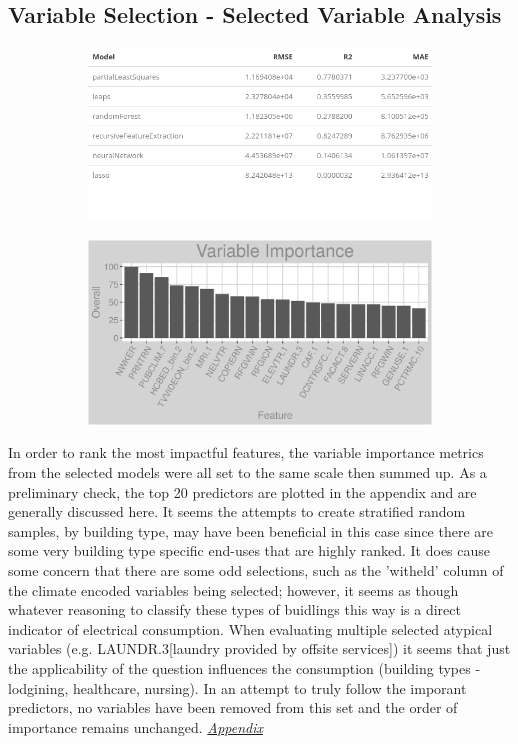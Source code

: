 \subsection{Variable Selection - Selected Variable Analysis}
\begin{figure}[h]
\begin{subfigure}{1\textwidth}
\centering
\includegraphics[width=.6\textwidth, height=0.2\textheight]{Images/electricity_fe_summary.png}
\end{subfigure}
\begin{subfigure}{1\textwidth}
\centering
\includegraphics[width=.99\textwidth, height=0.3\textheight]{Images/electricity_all_vars.png}
\end{subfigure}
\end{figure}
In order to rank the most impactful features, the variable importance metrics from the selected models were all set to the same scale then summed up.  As a preliminary check, the top 20 predictors are plotted in the appendix and are generally discussed here.  It seems the attempts to create stratified random samples, by building type, may have been beneficial in this case since there are some very building type specific end-uses that are highly ranked.  It does cause some concern that there are some odd selections, such as the 'witheld' column of the climate encoded variables being selected; however, it seems as though whatever reasoning to classify these types of buidlings this way is a direct indicator of electrical consumption.  When evaluating multiple selected atypical variables (e.g. LAUNDR.3[laundry provided by offsite services]) it seems that just the applicability of the question influences the consumption (building types - lodgining, healthcare, nursing).  In an attempt to truly follow the imporant predictors, no variables have been removed from this set and the order of importance remains unchanged.  \textit{\hyperref[appendix:electricity:sva]{Appendix}}